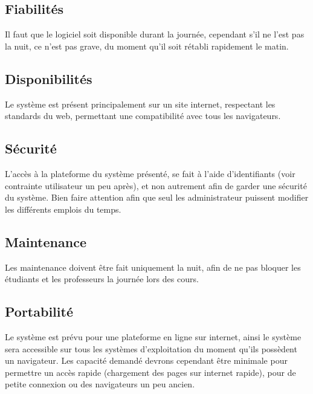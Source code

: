 \documentclass[a4paper, 11pt]{article}
\begin{document}
        \subsection{Fiabilités}
        Il faut que le logiciel soit disponible durant la journée, cependant s'il ne l'est pas la nuit, ce n'est pas grave, du moment qu'il soit rétabli rapidement le matin. 
        \subsection{Disponibilités}
        Le système est présent principalement sur un site internet, respectant les standards du web, permettant une compatibilité avec tous les navigateurs.
        \subsection{ Sécurité}
        L'accès à la plateforme du système présenté, se fait à l'aide d'identifiants (voir contrainte utilisateur un peu après), et non autrement afin de garder une sécurité du système. Bien faire attention afin que seul les administrateur puissent modifier les différents emplois du temps. 
        \subsection{Maintenance}
        Les maintenance doivent être fait uniquement la nuit, afin de ne pas bloquer les étudiants et les professeurs la journée lors des cours.
        \subsection{ Portabilité}
        Le système est prévu pour une plateforme en ligne sur internet, ainsi le système sera accessible sur tous les systèmes d'exploitation du moment qu'ils possèdent un navigateur. Les capacité demandé devrons cependant être minimale pour permettre un accès rapide (chargement des pages sur internet rapide), pour de petite connexion ou des navigateurs un peu ancien.
	\clearpage
\end{document}
